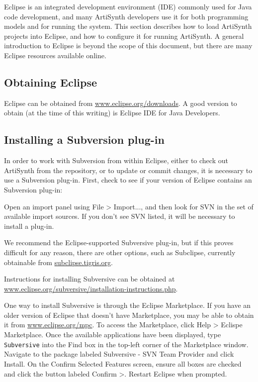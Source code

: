 Eclipse is an integrated development environment (IDE) commonly used
for Java code development, and many ArtiSynth developers use it for
both programming models and for running the system. This section
describes how to load ArtiSynth projects into Eclipse, and how to
configure it for running ArtiSynth. A general introduction to Eclipse
is beyond the scope of this document, but there are many Eclipse
resources available online.

\subsection{Obtaining Eclipse}

Eclipse can be obtained from
\href{http://www.eclipse.org/downloads}{www.eclipse.org/downloads}.  A
good version to obtain (at the time of this writing) is {\sf Eclipse
IDE for Java Developers}.

\subsection{Installing a Subversion plug-in}
\label{SubversionPlugIn}

In order to work with Subversion from within Eclipse, either to check
out ArtiSynth from the repository, or to update or commit changes, it
is necessary to use a Subversion plug-in. First, check to see if your
version of Eclipse contains an Subversion plug-in:

Open an import panel using {\sf File > Import...}, and then look for
{\sf SVN} in the set of available import sources. If you don't see SVN
listed, it will be necessary to install a plug-in.

We recommend the Eclipse-supported Subversive plug-in, but if this
proves difficult for any reason, there are other options, such as
Subclipse, currently obtainable from
\href{http://subclipse.tigris.org/servlets/ProjectProcess?pageID=p4wYuA}
{subclipse.tigris.org}.

Instructions for installing Subversive can be obtained at
\href{http://www.eclipse.org/subversive/installation-instructions.php}
{www.eclipse.org/subversive/installation-instructions.php}.

One way to install Subversive is through the Eclipse Marketplace.  If
you have an older version of Eclipse that doesn't have Marketplace,
you may be able to obtain it from
\href{http://www.eclipse.org/mpc/}{www.eclipse.org/mpc}.  To access
the Marketplace, click {\sf Help > Eclispe Marketplace}. Once the
available applications have been displayed, type {\tt Subversive} into
the {\sf Find} box in the top-left corner of the Marketplace
window. Navigate to the package labeled {\sf Subversive - SVN Team
Provider} and click {\sf Install}. On the {\sf Confirm Selected
Features} screen, ensure all boxes are checked and click the button
labeled {\sf Confirm >}. Restart Eclipse when prompted.

